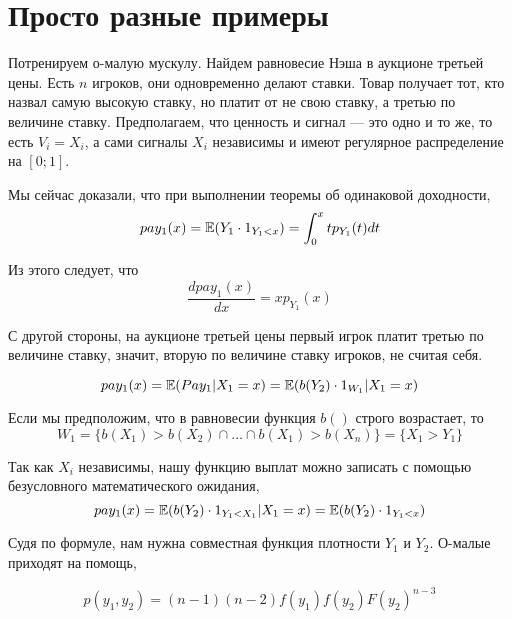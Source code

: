 \section{Просто разные примеры}


\begin{myex} Потренируем о-малую мускулу. Найдем равновесие Нэша в аукционе третьей цены. Есть $ n $ игроков, они одновременно делают ставки. Товар получает тот, кто назвал самую высокую ставку, но платит от не свою ставку, а третью по величине ставку. Предполагаем, что ценность и сигнал — это одно и то же, то есть $ V_{i}=X_{i} $, а сами сигналы $ X_{i} $ независимы и имеют регулярное распределение на $ [0;1] $.


Мы сейчас доказали, что при выполнении теоремы об одинаковой доходности,
\begin{equation}
pay_{1}(x)=\operatorname{\mathbb{E}}(Y_{1}\cdot 1_{Y_{1}<x})=\int_{0}^{x}tp_{Y_{1}}(t)dt
\end{equation}

Из этого следует, что
\begin{equation}
\frac{dpay_{1}(x)}{dx}=xp_{Y_{1}}(x)
\end{equation}


С другой стороны, на аукционе третьей цены первый игрок платит третью по величине ставку, значит, вторую по величине ставку игроков, не считая себя.

\begin{equation}
pay_{1}(x)=\operatorname{\mathbb{E}}(Pay_{1}|X_{1}=x)=\operatorname{\mathbb{E}}(b(Y_{2})\cdot 1_{W_{1}}|X_{1}=x)
\end{equation}

Если мы предположим, что в равновесии функция $ b() $ строго возрастает, то
\begin{equation}
W_{1}=\{b(X_{1})>b(X_{2})\cap \ldots\cap  b(X_{1})>b(X_{n})\}=\{X_{1}>Y_{1}\}
\end{equation}

Так как $ X_{i} $ независимы, нашу функцию выплат можно записать с помощью безусловного математического ожидания,
\begin{equation}
pay_{1}(x)=\operatorname{\mathbb{E}}(b(Y_{2})\cdot 1_{Y_{1}<X_{1}}|X_{1}=x)=\operatorname{\mathbb{E}}(b(Y_{2})\cdot 1_{Y_{1}<x})
\end{equation}

Судя по формуле, нам нужна совместная функция плотности $ Y_{1} $ и $ Y_{2} $. О-малые приходят на помощь,

\begin{equation}
p(y_{1},y_{2})=(n-1)(n-2)f(y_{1})f(y_{2})F(y_{2})^{n-3}
\end{equation}


\end{myex}

